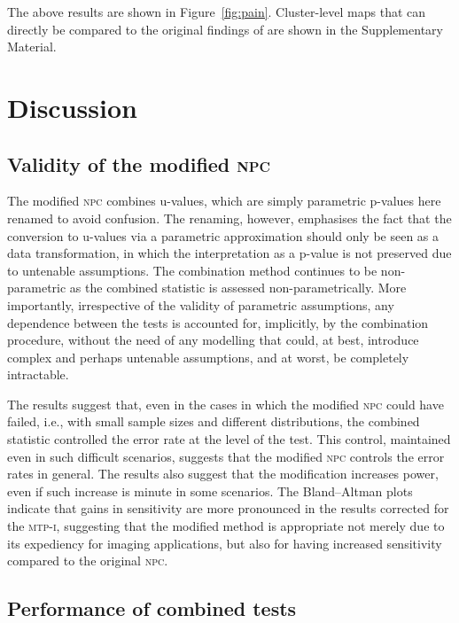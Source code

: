 The above results are shown in Figure~\ref{fig:pain}. Cluster-level maps that can directly be compared to the original findings of \citet{Brooks2005} are shown in the Supplementary Material.

\section{Discussion}

\subsection{Validity of the modified \textsc{npc}}

The modified \textsc{npc} combines u-values, which are simply parametric p-values here renamed to avoid confusion. The renaming, however, emphasises the fact that the conversion to u-values via a parametric approximation should only be seen as a data transformation, in which the interpretation as a p-value is not preserved due to untenable assumptions. The combination method continues to be non-parametric as the combined statistic is assessed non-parametrically. More importantly, irrespective of the validity of parametric assumptions, any dependence between the tests is accounted for, implicitly, by the combination procedure, without the need of any modelling that could, at best, introduce complex and perhaps untenable assumptions, and at worst, be completely intractable.

The results suggest that, even in the cases in which the modified \textsc{npc} could have failed, i.e., with small sample sizes and different distributions, the combined statistic controlled the error rate at the level of the test. This control, maintained even in such difficult scenarios, suggests that the modified \textsc{npc} controls the error rates in general. The results also suggest that the modification increases power, even if such increase is minute in some scenarios. The Bland--Altman plots indicate that gains in sensitivity are more pronounced in the results corrected for the \textsc{mtp-i}, suggesting that the modified method is appropriate not merely due to its expediency for imaging applications, but also for having increased sensitivity compared to the original \textsc{npc}.

\subsection{Performance of combined tests}

